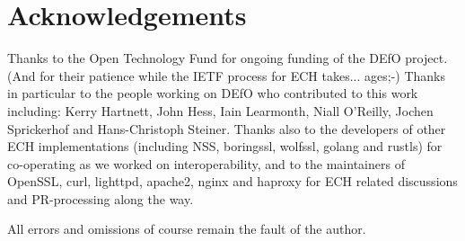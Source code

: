 \section*{Acknowledgements}

Thanks to the Open Technology Fund for ongoing funding of the DEfO
project. (And for their patience while the IETF process for ECH takes...
ages;-)
Thanks in particular to the people working on DEfO who contributed to this work
including:
Kerry Hartnett,
John Hess,
Iain Learmonth,
Niall O'Reilly,
Jochen Sprickerhof
and Hans-Christoph Steiner.
Thanks also to the developers of other ECH implementations (including
NSS, boringssl, wolfssl, golang and rustls) for co-operating as we worked on
interoperability, and to the maintainers of OpenSSL, curl, lighttpd, apache2,
nginx and haproxy for ECH related discussions and PR-processing along the way.

All errors and omissions of course remain the fault of the author.
